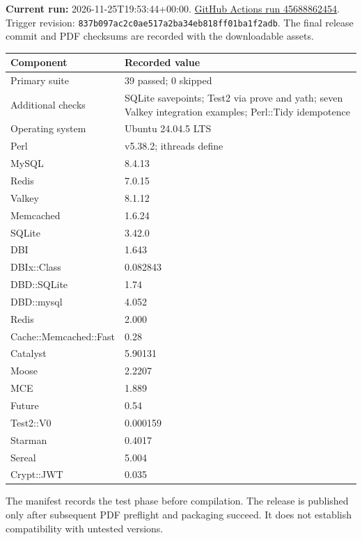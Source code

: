 \textbf{Current run:} 2026-11-25T19:53:44+00:00. \href{https://github.com/interrupt21h/Modern-Perl-Concurrency/actions/runs/45688862454}{GitHub Actions run 45688862454}.
Trigger revision: \nolinkurl{837b097ac2c0ae517a2ba34eb818ff01ba1f2adb}. The final release commit and PDF checksums are recorded with the downloadable assets.
\begin{longtable}{L{.30\linewidth}L{.62\linewidth}}\toprule Component & Recorded value \\ \midrule\endhead
Primary suite & 39 passed; 0 skipped\\
Additional checks & SQLite savepoints; Test2 via prove and yath; seven Valkey integration examples; Perl::Tidy idempotence\\
Operating system & Ubuntu 24.04.5 LTS\\
Perl & v5.38.2; ithreads define\\
MySQL & 8.4.13\\
Redis & 7.0.15\\
Valkey & 8.1.12\\
Memcached & 1.6.24\\
SQLite & 3.42.0\\
DBI & 1.643\\
DBIx::Class & 0.082843\\
DBD::SQLite & 1.74\\
DBD::mysql & 4.052\\
Redis & 2.000\\
Cache::Memcached::Fast & 0.28\\
Catalyst & 5.90131\\
Moose & 2.2207\\
MCE & 1.889\\
Future & 0.54\\
Test2::V0 & 0.000159\\
Starman & 0.4017\\
Sereal & 5.004\\
Crypt::JWT & 0.035\\
\bottomrule\end{longtable}
The manifest records the test phase before compilation. The release is published only after subsequent PDF preflight and packaging succeed. It does not establish compatibility with untested versions.
